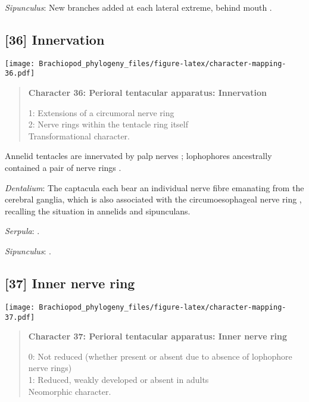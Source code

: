 \documentclass[openany]{book}
\theoremstyle{definition}
\theoremstyle{definition}
\theoremstyle{definition}
\theoremstyle{remark}
\begin{document}
\hypertarget{Sipunculus-coding-35}{}
\emph{Sipunculus}: New branches added at each lateral extreme, behind
mouth \citep{Adrianov2006}.

\subsection*{{[}36{]} Innervation}\label{innervation}

\texttt{[image: Brachiopod\_phylogeny\_files/figure-latex/character-mapping-36.pdf]}

\begin{quote}
\textbf{Character 36: Perioral tentacular apparatus: Innervation}

1: Extensions of a circumoral nerve ring\\
2: Nerve rings within the tentacle ring itself\\
Transformational character.
\end{quote}

Annelid tentacles are innervated by palp nerves \citep{Orrhage2005};
lophophores ancestrally contained a pair of nerve rings
\citep{Temereva2017Innervationof}.

\hypertarget{Dentalium-coding-36}{}
\emph{Dentalium}: The captacula each bear an individual nerve fibre
emanating from the cerebral ganglia, which is also associated with the
circumoesophageal nerve ring \citep{SumnerRooney2015}, recalling the
situation in annelids and sipunculans.

\hypertarget{Serpula-coding-36}{}
\emph{Serpula}: \citet{Orrhage2005}.

\hypertarget{Sipunculus-coding-36}{}
\emph{Sipunculus}: \citet{Rice1993}.

\subsection*{{[}37{]} Inner nerve ring}\label{inner-nerve-ring}

\texttt{[image: Brachiopod\_phylogeny\_files/figure-latex/character-mapping-37.pdf]}

\begin{quote}
\textbf{Character 37: Perioral tentacular apparatus: Inner nerve ring}

0: Not reduced (whether present or absent due to absence of lophophore
nerve rings)\\
1: Reduced, weakly developed or absent in adults\\
Neomorphic character.
\end{quote}
\end{document}
